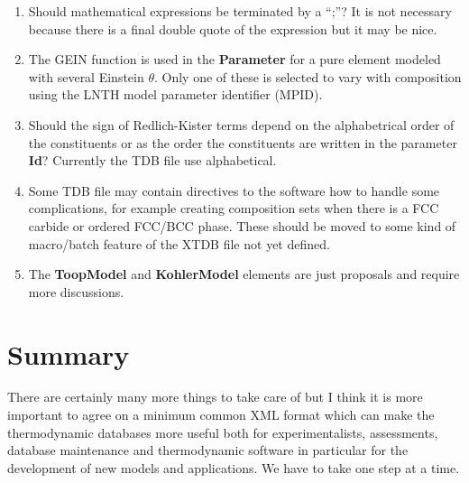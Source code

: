 \documentclass{article}
\begin{document}
\begin{enumerate}
\item Should mathematical expressions be terminated by a ``;''?  It is
  not necessary because there is a final double quote of the expression
  but it may be nice.

\item The GEIN function is used in the {\bf Parameter} for a pure
  element modeled with several Einstein $\theta$.  Only one of these
  is selected to vary with composition using the LNTH model parameter
  identifier (MPID).

\item Should the sign of Redlich-Kister terms depend on the
  alphabetrical order of the constituents or as the order the
  constituents are written in the parameter {\bf Id}?  Currently the
  TDB file use alphabetical.

\item Some TDB file may contain directives to the software how to
  handle some complications, for example creating composition sets
  when there is a FCC carbide or ordered FCC/BCC phase.  These should
  be moved to some kind of macro/batch feature of the XTDB file not
  yet defined.

\item The {\bf ToopModel} and {\bf KohlerModel} elements are just
  proposals and require more discussions.
  
\end{enumerate}

\section{Summary}

There are certainly many more things to take care of but I think it is
more important to agree on a minimum common XML format which can make
the thermodynamic databases more useful both for experimentalists,
assessments, database maintenance and thermodynamic software in
particular for the development of new models and applications.  We
have to take one step at a time.
\end{document}
